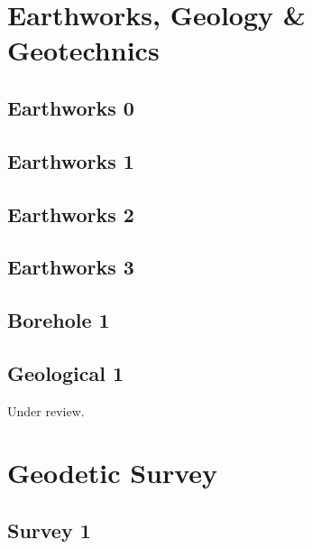 \documentclass{scrartcl}
\begin{document}
\section{Earthworks, Geology \& Geotechnics}
\label{sec:earthworks}

\subsection{Earthworks 0}
\label{sec:earth_0}
\clearpage

\subsection{Earthworks 1}
\label{sec:earth_1}
\clearpage

\subsection{Earthworks 2}
\label{sec:earth_2}
\clearpage

\subsection{Earthworks 3}
\label{sec:earth_3}
\clearpage

\subsection{Borehole 1}
\label{sec:borehole_1}
\clearpage

\subsection{Geological 1} %
\label{sec:geological_1}
Under review.%
\clearpage

\section{Geodetic Survey}
\label{sec:geodetic_survey}

\subsection{Survey 1}
\label{sec:survey_1}
\clearpage
\end{document}
